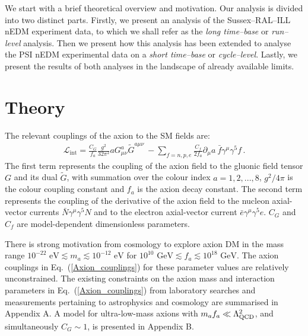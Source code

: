 
 We start with a brief theoretical overview and motivation. Our analysis is divided into two distinct parts. Firstly, we present an analysis of the Sussex--RAL--ILL nEDM experiment data, to which we shall refer as the \emph{long time--base} or \emph{run--level} analysis.  Then we present how this analysis has been extended to analyse the PSI nEDM experimental data on a \emph{short time--base} or \emph{cycle--level}. Lastly, we present the results of both analyses in the landscape of already available limits.


\section{Theory}
The relevant couplings of the axion to the SM fields are:
\begin{align}
\label{Axion_couplings}
\mathcal{L}_{\textrm{int}} = \frac{C_G}{f_a} \frac{g^2}{32\pi^2} a G^{a}_{\mu \nu} \tilde{G}^{a \mu \nu}  ~ - \sum_{f=n,p,e} \frac{C_f}{2f_a} \partial_\mu a ~ \bar{f} \gamma^\mu \gamma^5 f \, .
\end{align}
The first term represents the coupling of the axion field to the gluonic field tensor $G$ and its dual $\tilde{G}$, with summation over the colour index $a=1,2,...,8$, $g^2 / 4 \pi$ is the colour coupling constant and $f_a$ is the axion decay constant. The second term represents the coupling of the derivative of the axion field to the nucleon axial-vector currents $\bar{N} \gamma^\mu \gamma^5 N$ and to the electron axial-vector current $\bar{e} \gamma^\mu \gamma^5 e$.
$C_G$ and $C_f$ are model-dependent dimensionless parameters.

There is strong motivation from cosmology to explore axion DM in the mass range $10^{-22}\text{ eV}\lesssim m_a \lesssim 10^{-12}\text{ eV}$ for $10^{10}\text{ GeV}\lesssim f_a \lesssim 10^{18}\text{ GeV}$.
The axion couplings in Eq.~(\ref{Axion_couplings}) for these parameter values are relatively unconstrained.
The existing constraints on the axion mass and interaction parameters in Eq.~(\ref{Axion_couplings}) from laboratory searches and measurements pertaining to astrophysics and cosmology are summarised in Appendix A.
A model for ultra-low-mass axions with $m_af_a\ll \Lambda_{\rm QCD}^2$, and simultaneously $C_G\sim 1$, is presented in Appendix B.

